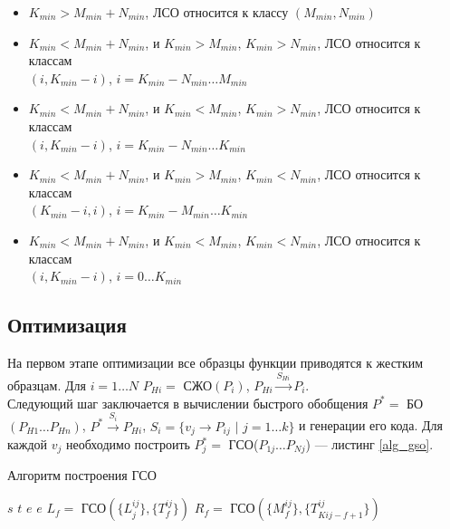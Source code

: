 \documentclass[12pt]{article}
\begin{document}
\begin{itemize}
\item $K_{min} > M_{min} + N_{min}$, ЛСО относится к классу $(M_{min}, N_{min})$
\item $K_{min} < M_{min} + N_{min}$, и $K_{min} > M_{min}$, $K_{min} > N_{min}$, ЛСО относится к классам\\ \indent$(i, K_{min} - i)$, $i = K_{min} - N_{min} \ldots M_{min}$ 
\item $K_{min} < M_{min} + N_{min}$, и $K_{min} < M_{min}$, $K_{min} > N_{min}$, ЛСО относится к классам\\ \indent$(i, K_{min} - i)$, $i = K_{min} - N_{min} \ldots K_{min}$ 
\item $K_{min} < M_{min} + N_{min}$, и $K_{min} > M_{min}$, $K_{min} < N_{min}$, ЛСО относится к классам\\ \indent$(K_{min} - i, i)$, $i = K_{min} - M_{min} \ldots K_{min}$
\item $K_{min} < M_{min} + N_{min}$, и $K_{min} < M_{min}$, $K_{min} < N_{min}$, ЛСО относится к классам\\ \indent$(i, K_{min} - i)$, $i = 0 \ldots K_{min}$
\end{itemize}
 

\subsection[Оптимизация]{\large Оптимизация}
\hspace{\parindent} На первом этапе оптимизации все образцы функции приводятся к жестким образцам. Для $i = 1 \ldots N$ $P_{Hi} = $ СЖО$(P_i)$, $P_{Hi} \xrightarrow{S_{Hi}} P_i$.\\
\indent Следующий шаг заключается в вычислении быстрого обобщения $P^{*} = $ БО$(P_{H1} \ldots P_{Hn})$, $P^{*} \xrightarrow{S_i} P_{Hi}$, $S_i = \{v_j \to P_{ij}$ $|$ $j = 1\ldots k \}$ и генерации его кода. Для каждой $v_j$ необходимо построить $P_j^* = $ ГСО($P_{1j} \ldots P_{Nj}$) --- листинг \ref{alg_gso}.
 
\begin{algorithm}[h]
\caption{Алгоритм построения ГСО}\label{alg_gso}
\begin{algorithmic}[1]
		\State \Return $s$
	\EndIf
		\State \Return $t$
	\EndIf
		\State {}
		\State {}
		\State {}
		\State {}		
			\State \Return $e$
		\EndIf
			\State \Return $e$
		\EndIf
		\State $L_f = $ ГСО$(\{L_j^{ij}\}, \{T_f^{ij}\})$
		\State $R_f = $ ГСО$(\{M_f^{ij}\}, \{T_{Kij-f+1}^{ij}\})$	
		\State {} 	
	\EndIf
\EndFunction
\end{algorithmic}
\end{algorithm}
\end{document}
